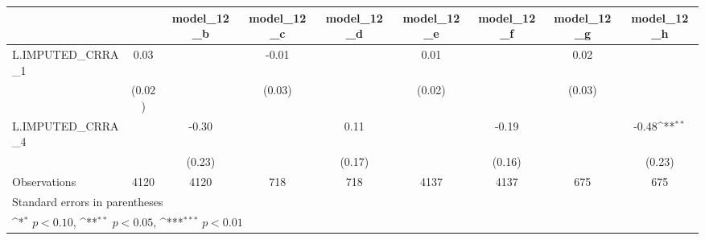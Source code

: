 {
\def\sym#1{\ifmmode^{#1}\else\(^{#1}\)\fi}
\begin{tabular}{l*{8}{c}}
\toprule
                &\multicolumn{1}{c}{}&\multicolumn{1}{c}{model\_12\_b}&\multicolumn{1}{c}{model\_12\_c}&\multicolumn{1}{c}{model\_12\_d}&\multicolumn{1}{c}{model\_12\_e}&\multicolumn{1}{c}{model\_12\_f}&\multicolumn{1}{c}{model\_12\_g}&\multicolumn{1}{c}{model\_12\_h}\\
\midrule
L.IMPUTED\_CRRA\_1&     0.03         &                  &    -0.01         &                  &     0.01         &                  &     0.02         &                  \\
                &   (0.02)         &                  &   (0.03)         &                  &   (0.02)         &                  &   (0.03)         &                  \\
\addlinespace
L.IMPUTED\_CRRA\_4&                  &    -0.30         &                  &     0.11         &                  &    -0.19         &                  &    -0.48\sym{**} \\
                &                  &   (0.23)         &                  &   (0.17)         &                  &   (0.16)         &                  &   (0.23)         \\
\midrule
Observations    &     4120         &     4120         &      718         &      718         &     4137         &     4137         &      675         &      675         \\
\bottomrule
\multicolumn{9}{l}{\footnotesize Standard errors in parentheses}\\
\multicolumn{9}{l}{\footnotesize \sym{*} \(p<0.10\), \sym{**} \(p<0.05\), \sym{***} \(p<0.01\)}\\
\end{tabular}
}
